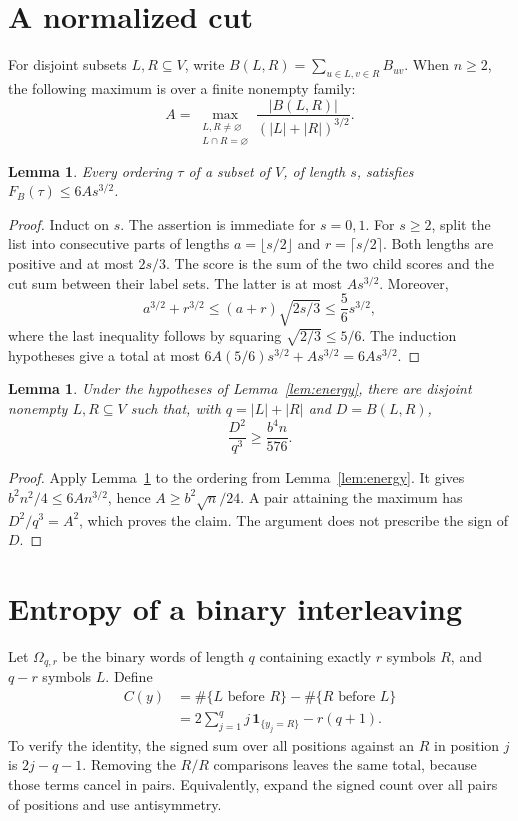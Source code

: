 \documentclass[11pt,a4paper]{article}
\newtheorem{lemma}[theorem]{Lemma}
\begin{document}
\section{A normalized cut}

For disjoint subsets $L,R\subseteq V$, write
$B(L,R)=\sum_{u\in L,v\in R}B_{uv}$. When $n\geq2$, the following maximum
is over a finite nonempty family:
\[
A=\max_{\substack{L,R\ne\varnothing\\L\cap R=\varnothing}}
\frac{|B(L,R)|}{(|L|+|R|)^{3/2}}.
\]

\begin{lemma}\label{lem:ordering}
Every ordering $\tau$ of a subset of $V$, of length $s$, satisfies
$F_B(\tau)\leq6A s^{3/2}$.
\end{lemma}
\begin{proof}
Induct on $s$. The assertion is immediate for $s=0,1$. For $s\geq2$, split
the list into consecutive parts of lengths $a=\lfloor s/2\rfloor$ and
$r=\lceil s/2\rceil$. Both lengths are positive and at most $2s/3$.
The score is the sum of the two child scores and the cut sum between their
label sets. The latter is at most $A s^{3/2}$. Moreover,
\[
a^{3/2}+r^{3/2}
\leq(a+r)\sqrt{2s/3}
\leq\frac56s^{3/2},
\]
where the last inequality follows by squaring
$\sqrt{2/3}\leq5/6$. The induction hypotheses give a total at most
$6A(5/6)s^{3/2}+As^{3/2}=6As^{3/2}$.
\end{proof}

\begin{lemma}\label{lem:cut}
Under the hypotheses of Lemma~\ref{lem:energy}, there are disjoint nonempty
$L,R\subseteq V$ such that, with $q=|L|+|R|$ and $D=B(L,R)$,
\begin{equation}\label{eq:cut}
\frac{D^2}{q^3}\geq\frac{b^4n}{576}.
\end{equation}
\end{lemma}
\begin{proof}
Apply Lemma~\ref{lem:ordering} to the ordering from
Lemma~\ref{lem:energy}. It gives
$b^2n^2/4\leq6An^{3/2}$, hence $A\geq b^2\sqrt n/24$.
A pair attaining the maximum has $D^2/q^3=A^2$, which proves the claim.
The argument does not prescribe the sign of $D$.
\end{proof}

\section{Entropy of a binary interleaving}

Let $\Omega_{q,r}$ be the binary words of length $q$ containing exactly $r$
symbols $R$, and $q-r$ symbols $L$. Define
\begin{align*}
C(y)&=\#\{L\text{ before }R\}-\#\{R\text{ before }L\}\\
&=2\sum_{j=1}^{q}j\,\mathbf1_{\{y_j=R\}}-r(q+1).
\end{align*}
To verify the identity, the signed sum over all positions against an $R$
in position $j$ is $2j-q-1$. Removing the $R/R$ comparisons leaves the same
total, because those terms cancel in pairs. Equivalently, expand the
signed count over all pairs of positions and use antisymmetry.
\end{document}
